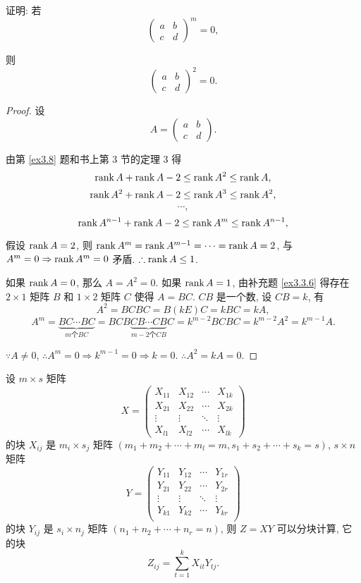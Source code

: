 \documentclass[color=black,device=normal,lang=cn,mode=geye]{elegantnote}
\begin{document}
\begin{exercise}%
    证明: 若
    \[\begin{pmatrix}
        a & b \\
        c & d
    \end{pmatrix}^m=0,\]

    则
    \[\begin{pmatrix}
        a & b \\
        c & d
    \end{pmatrix}^2=0.\]
\end{exercise}
\begin{proof}
    设
    \[A=\begin{pmatrix}
        a & b \\
        c & d
    \end{pmatrix}.\]

    由第 \ref{ex3.8} 题和书上第 3 节的定理 3 得
    \[\operatorname{rank} A+\operatorname{rank} A-2\leq\operatorname{rank} A^2\leq\operatorname{rank} A,\]
    \[\operatorname{rank} A^2+\operatorname{rank} A-2\leq\operatorname{rank} A^3\leq\operatorname{rank} A^2,\]
    \[\cdots,\]
    \[\operatorname{rank} A^{n-1}+\operatorname{rank} A-2\leq\operatorname{rank} A^m\leq\operatorname{rank} A^{n-1},\]

    假设 $\operatorname{rank} A=2$, 则 $\operatorname{rank} A^m=\operatorname{rank} A^{m-1}=\cdots=\operatorname{rank} A=2$, 与 $A^m=0\Rightarrow\operatorname{rank} A^m=0$ 矛盾. $\therefore\operatorname{rank} A\leq 1$.

    如果 $\operatorname{rank} A=0$, 那么 $A=A^2=0$. 如果 $\operatorname{rank} A=1$, 由补充题 \ref{ex3.3.6} 得存在 $2\times1$ 矩阵 $B$ 和 $1\times 2$ 矩阵 $C$ 使得 $A=BC$. $CB$ 是一个数, 设 $CB=k$, 有
    \[A^2=BCBC=B(kE)C=kBC=kA,\]
    \[A^m=\underbrace{BC\cdots BC}_{m\text{个}BC}=BCB\underbrace{CB\cdots CB}_{m-2\text{个}CB}C=k^{m-2}BCBC=k^{m-2}A^2=k^{m-1}A.\]

    $\because A\neq0$, $\therefore A^m=0\Rightarrow k^{m-1}=0\Rightarrow k=0$. $\therefore A^2=kA=0$.
\end{proof}
\begin{exercise}\label{ex3.17}
    设 $m\times s$ 矩阵
    \[X=\begin{pmatrix}
        X_{11} & X_{12} & \cdots & X_{1k} \\
        X_{21} & X_{22} & \cdots & X_{2k} \\
        \vdots & \vdots & \ddots & \vdots \\
        X_{l1} & X_{l2} & \cdots & X_{lk}
    \end{pmatrix}\]
    的块 $X_{ij}$ 是 $m_i\times s_j$ 矩阵 $(m_1+m_2+\cdots+m_l=m,s_1+s_2+\cdots+s_k=s)$, $s\times n$ 矩阵
    \[Y=\begin{pmatrix}
        Y_{11} & Y_{12} & \cdots & Y_{1r} \\
        Y_{21} & Y_{22} & \cdots & Y_{2r} \\
        \vdots & \vdots & \ddots & \vdots \\
        Y_{k1} & Y_{k2} & \cdots & Y_{kr} \\
    \end{pmatrix}\]
    的块 $Y_{ij}$ 是 $s_i\times n_j$ 矩阵 $(n_1+n_2+\cdots+n_r=n)$, 则 $Z=XY$ 可以分块计算, 它的块
    \[Z_{ij}=\sum\limits_{t=1}^kX_{it}Y_{tj}.\]
\end{exercise}
\end{document}
